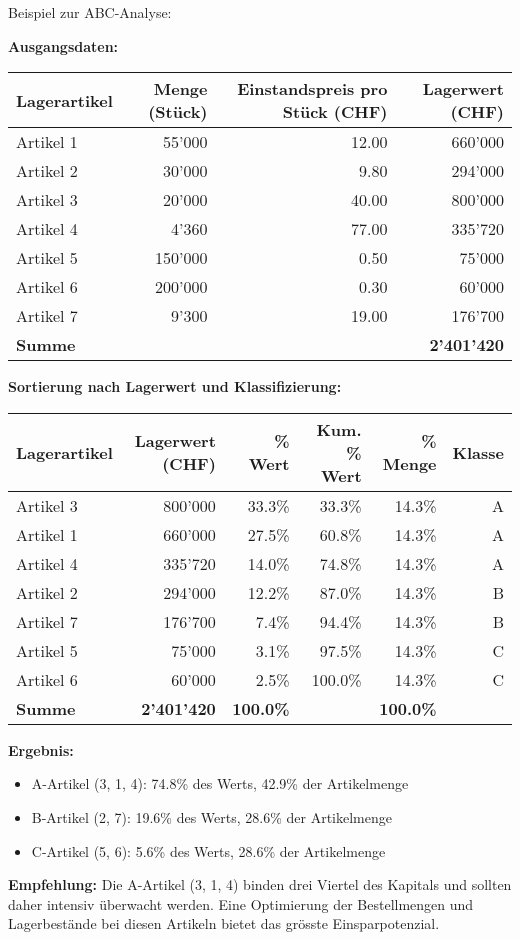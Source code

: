 \begin{example}
Beispiel zur ABC-Analyse:

\textbf{Ausgangsdaten:}

\begin{tabular}{|l|r|r|r|}
\hline
\textbf{Lagerartikel} & \textbf{Menge (Stück)} & \textbf{Einstandspreis pro Stück (CHF)} & \textbf{Lagerwert (CHF)} \\
\hline
Artikel 1 & 55'000 & 12.00 & 660'000 \\
\hline
Artikel 2 & 30'000 & 9.80 & 294'000 \\
\hline
Artikel 3 & 20'000 & 40.00 & 800'000 \\
\hline
Artikel 4 & 4'360 & 77.00 & 335'720 \\
\hline
Artikel 5 & 150'000 & 0.50 & 75'000 \\
\hline
Artikel 6 & 200'000 & 0.30 & 60'000 \\
\hline
Artikel 7 & 9'300 & 19.00 & 176'700 \\
\hline
\textbf{Summe} & & & \textbf{2'401'420} \\
\hline
\end{tabular}

\textbf{Sortierung nach Lagerwert und Klassifizierung:}

\begin{tabular}{|l|r|r|r|r|r|}
\hline
\textbf{Lagerartikel} & \textbf{Lagerwert (CHF)} & \textbf{\% Wert} & \textbf{Kum. \% Wert} & \textbf{\% Menge} & \textbf{Klasse} \\
\hline
Artikel 3 & 800'000 & 33.3\% & 33.3\% & 14.3\% & A \\
\hline
Artikel 1 & 660'000 & 27.5\% & 60.8\% & 14.3\% & A \\
\hline
Artikel 4 & 335'720 & 14.0\% & 74.8\% & 14.3\% & A \\
\hline
Artikel 2 & 294'000 & 12.2\% & 87.0\% & 14.3\% & B \\
\hline
Artikel 7 & 176'700 & 7.4\% & 94.4\% & 14.3\% & B \\
\hline
Artikel 5 & 75'000 & 3.1\% & 97.5\% & 14.3\% & C \\
\hline
Artikel 6 & 60'000 & 2.5\% & 100.0\% & 14.3\% & C \\
\hline
\textbf{Summe} & \textbf{2'401'420} & \textbf{100.0\%} & & \textbf{100.0\%} & \\
\hline
\end{tabular}

\textbf{Ergebnis:}
\begin{itemize}
    \item A-Artikel (3, 1, 4): 74.8\% des Werts, 42.9\% der Artikelmenge
    \item B-Artikel (2, 7): 19.6\% des Werts, 28.6\% der Artikelmenge
    \item C-Artikel (5, 6): 5.6\% des Werts, 28.6\% der Artikelmenge
\end{itemize}

\textbf{Empfehlung:}
Die A-Artikel (3, 1, 4) binden drei Viertel des Kapitals und sollten daher intensiv überwacht werden. Eine Optimierung der Bestellmengen und Lagerbestände bei diesen Artikeln bietet das grösste Einsparpotenzial.
\end{example}